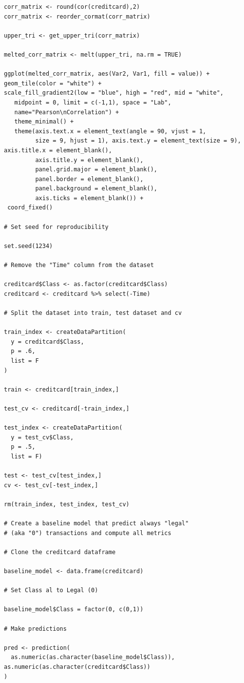 \documentclass[]{article}
\begin{document}
\begin{verbatim}
corr_matrix <- round(cor(creditcard),2)
corr_matrix <- reorder_cormat(corr_matrix)

upper_tri <- get_upper_tri(corr_matrix)

melted_corr_matrix <- melt(upper_tri, na.rm = TRUE)

ggplot(melted_corr_matrix, aes(Var2, Var1, fill = value)) +
geom_tile(color = "white") +
scale_fill_gradient2(low = "blue", high = "red", mid = "white", 
   midpoint = 0, limit = c(-1,1), space = "Lab", 
   name="Pearson\nCorrelation") +
   theme_minimal() + 
   theme(axis.text.x = element_text(angle = 90, vjust = 1, 
         size = 9, hjust = 1), axis.text.y = element_text(size = 9),                    axis.title.x = element_blank(),
         axis.title.y = element_blank(),
         panel.grid.major = element_blank(),
         panel.border = element_blank(),
         panel.background = element_blank(),
         axis.ticks = element_blank()) +
 coord_fixed()
 
# Set seed for reproducibility

set.seed(1234)

# Remove the "Time" column from the dataset

creditcard$Class <- as.factor(creditcard$Class)
creditcard <- creditcard %>% select(-Time)

# Split the dataset into train, test dataset and cv

train_index <- createDataPartition(
  y = creditcard$Class, 
  p = .6, 
  list = F
)

train <- creditcard[train_index,]

test_cv <- creditcard[-train_index,]

test_index <- createDataPartition(
  y = test_cv$Class, 
  p = .5, 
  list = F)

test <- test_cv[test_index,]
cv <- test_cv[-test_index,]

rm(train_index, test_index, test_cv)
 
# Create a baseline model that predict always "legal" 
# (aka "0") transactions and compute all metrics

# Clone the creditcard dataframe

baseline_model <- data.frame(creditcard)

# Set Class al to Legal (0)

baseline_model$Class = factor(0, c(0,1))

# Make predictions

pred <- prediction(
  as.numeric(as.character(baseline_model$Class)),                        as.numeric(as.character(creditcard$Class))
)


\end{verbatim}
\end{document}
